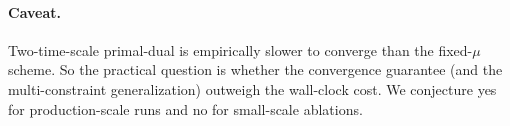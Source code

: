 \documentclass[11pt]{article}
\begin{document}
\paragraph{Caveat.} Two-time-scale primal-dual is empirically slower to converge than the fixed-$\mu$ scheme. So the practical question is whether the convergence guarantee (and the multi-constraint generalization) outweigh the wall-clock cost. We conjecture yes for production-scale runs and no for small-scale ablations.
\end{document}
